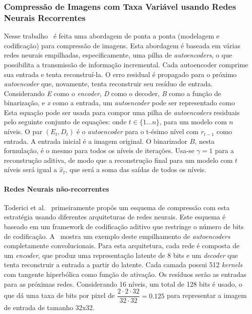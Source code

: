 \subsubsection{Compressão de Imagens com Taxa Variável usando Redes Neurais Recorrentes}
\label{variablerate}
Nesse trabalho~\cite{Variable2016Toderici} é feita uma abordagem de ponta a ponta (modelagem e codificação) para compressão de imagens. Esta abordagem é baseada em várias redes neurais empilhadas, especificamente, uma pilha de \textit{autoencoders}, o que possibilita a transmissão de informação incremental. Cada autoencoder comprime sua entrada e tenta reconstruí-la. O erro residual é propagado para o próximo \textit{autoencoder} que, novamente, tenta reconstruir seu resíduo de entrada. Considerando \textit{E} como o \textit{encoder}, \textit{D} como o decoder, \textit{B} como a função de binarização, e \textit{x} como a entrada, um \textit{autoencoder} pode ser representado como 
Esta equação pode ser usada para compor uma pilha de \textit{autoencoders} residuais pelo seguinte conjunto de equações:
onde $t \in \{1\dots n\}$, para um modelo com $n$ níveis. O par $(E_t, D_t)$ é o \textit{autoencoder} para o t-ésimo nível com $r_{t-1}$ como entrada. A entrada inicial é a imagem original. O binarizador $B$, nesta formulação, é o mesmo para todos os níveis de iterações. Usa-se $\gamma = 1$ para a reconstrução aditiva, de modo que a reconstrução final para um modelo com $t$ níveis será igual a $\hat{x}_t$, que será a soma das saídas de todos os níveis.
\paragraph{Redes Neurais não-recorrentes\\}

Toderici et al.~\cite{Variable2016Toderici} primeiramente propôs um esquema de compressão com esta estratégia usando diferentes arquiteturas de redes neurais. Este esquema é baseado em um framework de codificação aditivo que restringe o número de bits de codificação. A~ mostra um exemplo deste empilhamento de \textit{autoencoders} completamente convolucionais. Para esta arquitetura, cada rede é composta de um \textit{encoder}, que produz uma representação latente de 8 bits e um \textit{decoder} que tenta reconstruir a entrada a partir do latente. Cada camada possui 512 \textit{kernels} com tangente hiperbólica como função de ativação. Os resíduos serão as entradas para as próximas redes. Considerando 16 níveis, um total de 128 bits é usado, o que dá uma taxa de bits por pixel de $\dfrac{2 \cdot 2 \cdot 32}{32 \cdot 32} = 0.125$ para representar a imagem de entrada de tamanho 32x32. 

